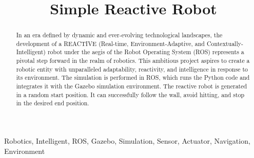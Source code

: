 \documentclass[conference]{IEEEtran}
\begin{document}
\title{Simple Reactive Robot\\
}

\author{

    \and

    \and

}


\maketitle

\begin{abstract}

    In an era defined by dynamic and ever-evolving technological landscapes, the development of a REACTIVE (Real-time, Environment-Adaptive, and Contextually-Intelligent) robot under the aegis of the Robot Operating System (ROS) represents a pivotal step forward in the realm of robotics. This ambitious project aspires to create a robotic entity with unparalleled adaptability, reactivity, and intelligence in response to its environment.  The simulation is performed in ROS, which runs the Python code and integrates it with the Gazebo simulation
    environment. The reactive robot is generated in a random start
    position. It can successfully follow the wall, avoid hitting, and stop
    in the desired end position.

\end{abstract}

\begin{IEEEkeywords}
    Robotics, Intelligent, ROS, Gazebo, Simulation, Sensor, Actuator, Navigation, Environment
\end{IEEEkeywords}
\end{document}
